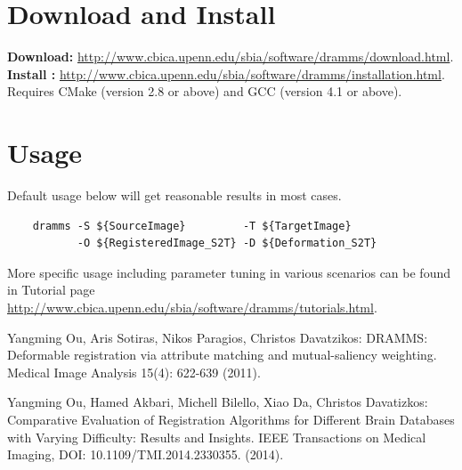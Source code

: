 \documentclass[a4paper,12pt]{article}
\begin{document}
\section{Download and Install}
\label{install}

{\bf{Download:}} \url{http://www.cbica.upenn.edu/sbia/software/dramms/download.html}. \\
{\bf{Install :}} \url{http://www.cbica.upenn.edu/sbia/software/dramms/installation.html}. Requires CMake (version 2.8 or above) and GCC (version 4.1 or above).




\section{Usage}
\label{usage}
Default usage below will get reasonable results in most cases. 
\begin{verbatim}
    dramms -S ${SourceImage}         -T ${TargetImage} 
           -O ${RegisteredImage_S2T} -D ${Deformation_S2T} 
\end{verbatim}
More specific usage including parameter tuning in various scenarios can be found in Tutorial page \url{http://www.cbica.upenn.edu/sbia/software/dramms/tutorials.html}.





\begin{thebibliography}{4}

 Yangming Ou, Aris Sotiras, Nikos Paragios, Christos Davatzikos: DRAMMS: Deformable registration via attribute matching and mutual-saliency weighting. Medical Image Analysis 15(4): 622-639 (2011).

 Yangming Ou, Hamed Akbari, Michell Bilello, Xiao Da, Christos Davatizkos: Comparative Evaluation of Registration Algorithms for Different Brain Databases with Varying Difficulty: Results and Insights. IEEE Transactions on Medical Imaging, DOI: 10.1109/TMI.2014.2330355. (2014).


\end{thebibliography}




\end{document}
